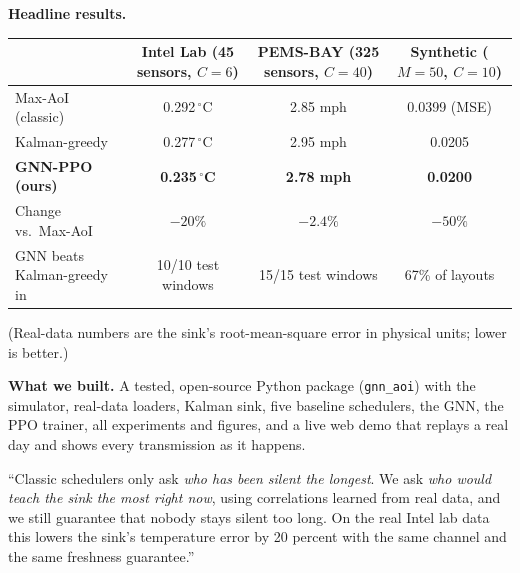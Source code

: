 \textbf{Headline results.}
\begin{center}
\small
\begin{tabular}{@{}lccc@{}}
  \toprule
  & \makecell{\textbf{Intel Lab}\\(45 sensors, $C=6$)} & \makecell{\textbf{PEMS-BAY}\\(325 sensors, $C=40$)} & \makecell{\textbf{Synthetic}\\($M=50$, $C=10$)} \\
  \midrule
  Max-AoI (classic) & 0.292\,$^\circ$C & 2.85 mph & 0.0399 (MSE) \\
  Kalman-greedy & 0.277\,$^\circ$C & 2.95 mph & 0.0205 \\
  \textbf{GNN-PPO (ours)} & \textbf{0.235\,$^\circ$C} & \textbf{2.78 mph} & \textbf{0.0200} \\
  Change vs.\ Max-AoI & $-20\%$ & $-2.4\%$ & $-50\%$ \\
  GNN beats Kalman-greedy in & 10/10 test windows & 15/15 test windows & 67\% of layouts \\
  \bottomrule
\end{tabular}
\end{center}
(Real-data numbers are the sink's root-mean-square error in physical units; lower is better.)

\textbf{What we built.} A tested, open-source Python package (\texttt{gnn\_aoi}) with the simulator, real-data
loaders, Kalman sink, five baseline schedulers, the GNN, the PPO trainer, all experiments and figures, and a live
web demo that replays a real day and shows every transmission as it happens.

\begin{saybox}
``Classic schedulers only ask \emph{who has been silent the longest}. We ask \emph{who would teach the sink the most
right now}, using correlations learned from real data, and we still guarantee that nobody stays silent too long.
On the real Intel lab data this lowers the sink's temperature error by 20 percent with the same channel and the same
freshness guarantee.''
\end{saybox}
